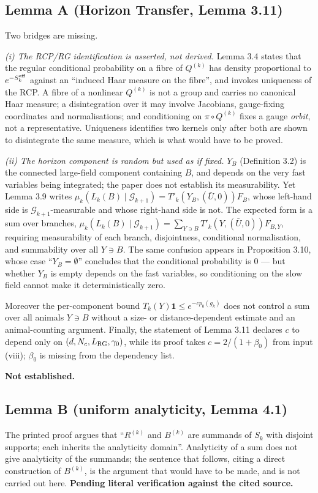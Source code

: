 \documentclass[11pt]{article}
\begin{document}
\subsection{Lemma A (Horizon Transfer, Lemma 3.11)} Two bridges are missing.

\emph{(i) The RCP/RG identification is asserted, not derived.} Lemma 3.4 states that the
regular conditional probability on a fibre of $Q^{(k)}$ has density proportional to
$e^{-S_k^{\rm eff}}$ against an ``induced Haar measure on the fibre'', and invokes
uniqueness of the RCP. A fibre of a nonlinear $Q^{(k)}$ is not a group and carries no
canonical Haar measure; a disintegration over it may involve Jacobians, gauge-fixing
coordinates and normalisations; and conditioning on $\pi\circ Q^{(k)}$ fixes a gauge
\emph{orbit}, not a representative. Uniqueness identifies two kernels only after both
are shown to disintegrate the same measure, which is what would have to be proved.

\emph{(ii) The horizon component is random but used as if fixed.} $Y_B$ (Definition 3.2)
is the connected large-field component containing $B$, and depends on the very fast
variables being integrated; the paper does not establish its measurability. Yet
Lemma 3.9 writes $\mu_k(L_k(B)\mid\mathcal G_{k+1})=T'_k(Y_B,(\bar U,0))F_B$, whose
left-hand side is $\mathcal G_{k+1}$-measurable and whose right-hand side is not. The
expected form is a sum over branches,
$\mu_k(L_k(B)\mid\mathcal G_{k+1})=\sum_{Y\ni B}T'_k(Y,(\bar U,0))F_{B,Y}$, requiring
measurability of each branch, disjointness, conditional normalisation, and
summability over all $Y\ni B$. The same confusion appears in Proposition 3.10, whose
case ``$Y_B=\emptyset$'' concludes that the conditional probability is $0$ --- but
whether $Y_B$ is empty depends on the fast variables, so conditioning on the slow field
cannot make it deterministically zero.

Moreover the per-component bound $T_k(Y)\mathbf 1\le e^{-cp_0(g_k)}$ does not control a
sum over all animals $Y\ni B$ without a size- or distance-dependent estimate and an
animal-counting argument. Finally, the statement of Lemma 3.11 declares $c$ to depend
only on $(d,N_c,L_{\rm RG},\gamma_0)$, while its proof takes $c=2/(1+\beta_0)$ from
input (viii); $\beta_0$ is missing from the dependency list.

\textbf{Not established.}

\subsection{Lemma B (uniform analyticity, Lemma 4.1)} The printed proof argues that
``$R^{(k)}$ and $B^{(k)}$ are summands of $S_k$ with disjoint supports; each inherits
the analyticity domain''. Analyticity of a sum does not give analyticity of the
summands; the sentence that follows, citing a direct construction of $B^{(k)}$, is the
argument that would have to be made, and is not carried out here. \textbf{Pending
literal verification against the cited source.}
\end{document}
